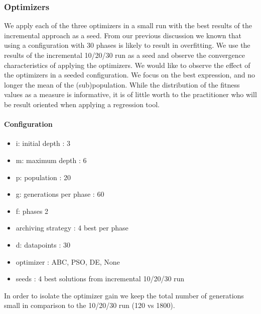 \subsubsection{Optimizers}
We apply each of the three optimizers in a small run with the best results of the incremental approach as a seed. From our previous discussion we known that using a configuration with 30 phases is likely to result in overfitting. We use the results of the incremental 10/20/30 run as a seed and observe the convergence characteristics of applying the optimizers.
We would like to observe the effect of the optimizers in a seeded configuration. We focus on the best expression, and no longer the mean of the (sub)population. While the distribution of the fitness values as a measure is informative, it is of little worth to the practitioner who will be result oriented when applying a regression tool.
\paragraph{Configuration}
\begin{itemize}
\item i: initial depth : 3
\item m: maximum depth : 6
\item p: population : 20
\item g: generations per phase : 60
\item f: phases 2
\item archiving strategy : 4 best per phase
\item d: datapoints : 30
\item optimizer : ABC, PSO, DE, None
\item seeds : 4 best solutions from incremental 10/20/30 run
\end{itemize}
In order to isolate the optimizer gain we keep the total number of generations small in comparison to the 10/20/30 run (120 vs 1800).
